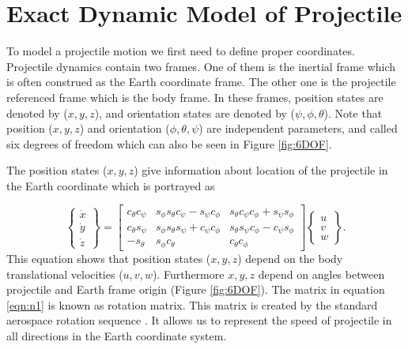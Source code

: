 \documentclass[letterpaper, 10 pt, conference]{ieeeconf}  %
\begin{document}
\section{Exact Dynamic Model of Projectile}

To model a projectile motion we first need to define proper coordinates. Projectile dynamics contain two frames. One of them is the inertial frame which is often construed as the Earth coordinate frame. The other one is the projectile referenced frame which is the body frame. In these frames, position states are denoted by ($x, y, z$), and orientation states are denoted by ($\psi, \phi, \theta$). Note that position ($x, y, z$) and orientation ($\phi, \theta, \psi$) are independent parameters, and called six degrees of freedom \cite{mccoy1999modern,amoruso1996euler} which can also be seen in Figure \ref{fig:6DOF}.

The position states ($x, y, z$) give information about location of the projectile in the Earth coordinate which is portrayed as

\begin{equation}
\begin{Bmatrix}
\dot{x} \\ \dot{y} \\ \dot{z} 

\end{Bmatrix}
=
\begin{bmatrix}
c_\theta c_\psi & s_\phi s_\theta c_\psi-s_\psi c_\phi & s_\theta c_\psi c_\phi + s_\psi s_\phi \\
c_\theta s_\psi & s_\phi s_\theta s_\psi+c_\psi c_\phi & s_\theta s_\psi c_\phi - c_\psi s_\phi \\

-s_\theta & s_\phi c_\theta & c_\theta c_\phi
\end{bmatrix}
\begin{Bmatrix}
u\\v\\w
\end{Bmatrix}.
\label{eqn:n1}
\end{equation}
This equation shows that position states ($x, y, z$) depend on the body translational velocities ($u, v, w$). Furthermore $x, y, z$ depend on angles between projectile and Earth frame origin (Figure \ref{fig:6DOF}). The matrix in equation \eqref{eqn:n1} is known as rotation matrix. This matrix is created by the standard aerospace rotation sequence \cite{fresconi2014theory}. It allows us to represent the speed of projectile in all directions in the Earth coordinate system.
\end{document}
